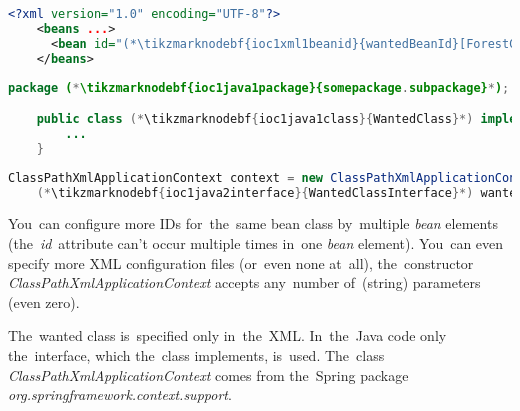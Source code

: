 \begin{lstlisting}[language=XML, title={Configuration XML}]
    <?xml version="1.0" encoding="UTF-8"?>
    <beans ...>
      <bean id="(*\tikzmarknodebf{ioc1xml1beanid}{wantedBeanId}[ForestGreen]*)" class="(*\tikzmarknodebf{ioc1xml1package}{somepackage.subpackage}[ForestGreen]*).(*\tikzmarknodebf{ioc1xml1class}{WantedClass}[ForestGreen]*)"/>
    </beans>
\end{lstlisting}
\begin{lstlisting}[language=Java, title={Wanted class}]
    package (*\tikzmarknodebf{ioc1java1package}{somepackage.subpackage}*);

    public class (*\tikzmarknodebf{ioc1java1class}{WantedClass}*) implements (*\tikzmarknodebf{ioc1java1interface}{WantedClassInterface}*) {
        ...
    }
\end{lstlisting}
\begin{lstlisting}[language=Java, title={Usage}]
    ClassPathXmlApplicationContext context = new ClassPathXmlApplicationContext("configurationFile.xml");
    (*\tikzmarknodebf{ioc1java2interface}{WantedClassInterface}*) wantedClassInstance = context.getBean("(*\tikzmarknodebf{ioc1java2beanid}{wantedBeanId}[ForestGreen]*)", (*\tikzmarknodebf{ioc1java2interface2}{WantedClassInterface}*).class);
\end{lstlisting}

\noindent You~can configure more IDs for~the~same bean class by~multiple \textit{bean} elements (the~\textit{id}~attribute can't occur multiple times in~one \textit{bean} element). You~can even specify more XML configuration files (or~even none at~all), the~constructor \mbox{\textit{ClassPathXmlApplicationContext}} accepts any~number of~(string) parameters (even zero).

The~wanted class is~specified only in~the~XML. In~the~Java code only the~interface, which the~class implements, is~used. The~class \textit{ClassPathXmlApplicationContext} comes from the~Spring package \textit{org.springframework.context.support}.

